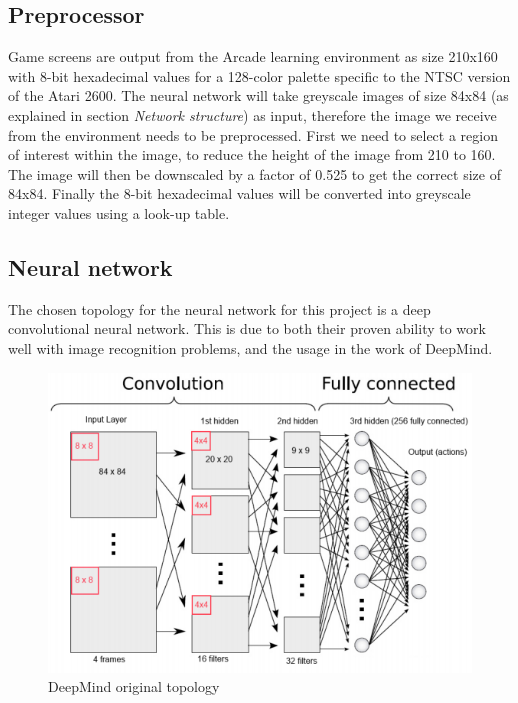 \documentclass[10pt]{article}
\begin{document}
	\medskip
	
	\subsection{Preprocessor}
		Game screens are output from the Arcade learning environment as size 210x160 with 8-bit hexadecimal values for a 128-color palette specific to the NTSC version of the Atari 2600. The neural network will take greyscale images of size 84x84 (as explained in section \textit{Network structure}) as input, therefore the image we receive from the environment needs to be preprocessed. First we need to select a region of interest within the image, to reduce the height of the image from 210 to 160. The image will then be downscaled by a factor of 0.525 to get the correct size of 84x84. Finally the 8-bit hexadecimal values will be converted into greyscale integer values using a look-up table.
	
	\medskip
	
	\subsection{Neural network}
		The chosen topology for the neural network for this project is a deep convolutional neural network. This is due to both their proven ability to work well with image recognition problems, and the usage in the work of DeepMind.\\
		
		\begin{figure}[h]				
			\includegraphics[scale=0.7]{img/structure}
			\centering
			\caption{DeepMind original topology \cite{repli}}
			\label{fig:topology13}
		\end{figure}
		
\end{document}

